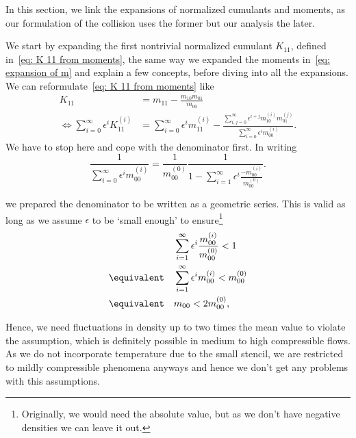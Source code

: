In this section, we link the expansions of normalized cumulants and moments, as our formulation of the collision uses the former but our analysis the later.

We start by expanding the first nontrivial normalized cumulant $K_{11}$, defined in~\eqref{eq: K 11 from moments}, the same way we expanded the moments in~\eqref{eq: expansion of m} and explain a few concepts, before diving into all the expansions.
We can reformulate~\eqref{eq: K 11 from moments} like
\begin{equation}
  \label{eq: first expansion}
  \begin{aligned}
    K_{11} & = m_{11} - \frac{m_{10}m_{01}}{m_{00}}\\
    \Leftrightarrow
    \sum_{i=0}^\infty \epsilon^i K_{11}^{(i)}
    & = \sum_{i=0}^\infty \epsilon^i m_{11}^{(i)} -
    \frac{\sum_{i,j=0}^\infty \epsilon^{i+j} m_{10}^{(i)}m_{01}^{(j)}}
        {\sum_{i=0}^\infty \epsilon^i m_{00}^{(i)}}.
  \end{aligned}
\end{equation}
We have to stop here and cope with the denominator first.
In writing
\begin{equation*}
  \frac{1}{\sum_{i=0}^\infty \epsilon^i m_{00}^{(i)}}=
  \frac{1}{m_{00}^{(0)}}
  \frac{1}{1 - \sum_{i=1}^\infty \epsilon^i \frac{ - m_{00}^{(i)}}{ m_{00}^{(0)}}}.
\end{equation*}

we prepared the denominator to be written as a geometric series.
This is valid as long as we assume $\epsilon$ to be `small enough' to ensure\footnote{Originally, we would need the absolute value, but as we don't have negative densities we can leave it out.}
\begin{align*}
  &\sum_{i=1}^\infty \epsilon^i \frac{ m_{00}^{(i)}}{ m_{00}^{(0)}}  < 1
  \\
  \equivalent\quad& \sum_{i=1}^\infty \epsilon^i  m_{00}^{(i)} < m_{00}^{(0)}
  \\
  \equivalent\quad& m_{00} < 2 m_{00}^{(0)},
\end{align*}

Hence, we need fluctuations in density up to two times the mean value to violate the assumption, which is definitely possible in medium to high compressible flows.
As we do not incorporate temperature due to the small stencil, we are restricted to mildly compressible phenomena anyways and hence we don't get any problems with this assumptions.

